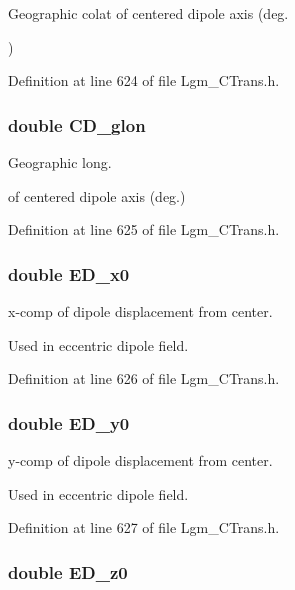 Geographic colat of centered dipole axis (deg. 

) 

Definition at line 624 of file Lgm\_\-CTrans.h.\hypertarget{struct_lgm___c_trans_3ce26131d2fbc511d6d6d5ac0efd5261}{
\subsubsection[{CD\_\-glon}]{\setlength{\rightskip}{0pt plus 5cm}double {\bf CD\_\-glon}}}
\label{struct_lgm___c_trans_3ce26131d2fbc511d6d6d5ac0efd5261}


Geographic long. 

of centered dipole axis (deg.) 

Definition at line 625 of file Lgm\_\-CTrans.h.\hypertarget{struct_lgm___c_trans_7adca911ad76a7b1b97969e38e9852ba}{
\subsubsection[{ED\_\-x0}]{\setlength{\rightskip}{0pt plus 5cm}double {\bf ED\_\-x0}}}
\label{struct_lgm___c_trans_7adca911ad76a7b1b97969e38e9852ba}


x-comp of dipole displacement from center. 

Used in eccentric dipole field. 

Definition at line 626 of file Lgm\_\-CTrans.h.\hypertarget{struct_lgm___c_trans_0365c6b352177b9f923ea9f3dedd5163}{
\subsubsection[{ED\_\-y0}]{\setlength{\rightskip}{0pt plus 5cm}double {\bf ED\_\-y0}}}
\label{struct_lgm___c_trans_0365c6b352177b9f923ea9f3dedd5163}


y-comp of dipole displacement from center. 

Used in eccentric dipole field. 

Definition at line 627 of file Lgm\_\-CTrans.h.\hypertarget{struct_lgm___c_trans_2ef284be0af92b46e986d8842790143c}{
\subsubsection[{ED\_\-z0}]{\setlength{\rightskip}{0pt plus 5cm}double {\bf ED\_\-z0}}}
\label{struct_lgm___c_trans_2ef284be0af92b46e986d8842790143c}


